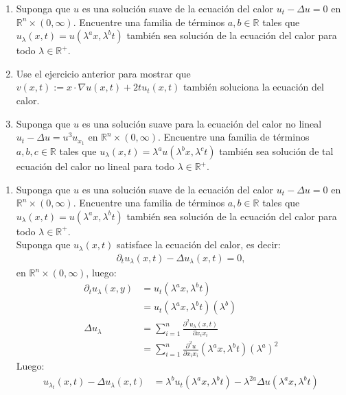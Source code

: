 \begin{homeworkProblem}
  \begin{enumerate}
    \item Suponga que $u$ es una solución suave de la ecuación del calor $u_t-\Delta u=0$ en $\mathbb{R}^{n}\times (0,\infty)$. Encuentre una familia de términos $a,b\in\mathbb{R}$ tales que $u_\lambda(x,t)=u(\lambda^ax,\lambda^bt)$ también sea solución de la ecuación del calor para todo $\lambda\in\mathbb{R}^{+}$.
    \item Use el ejercicio anterior para mostrar que $v(x,t):=x\cdot \nabla u(x,t)+2tu_t(x,t)$ también soluciona la ecuación del calor.
    \item Suponga que $u$ es una solución suave para la ecuación del calor no lineal $u_t-\Delta u=u^3u_{x_1}$ en $\mathbb{R}^{n}\times (0,\infty)$. Encuentre una familia de términos $a,b,c\in\mathbb{R}$ tales que $u_\lambda(x,t)=\lambda^au(\lambda^bx,\lambda^ct)$ también sea solución de tal ecuación del calor no lineal para todo $\lambda\in\mathbb{R}^{+}$. 
  \end{enumerate}
  \begin{solucion}
    \begin{enumerate}
      \item Suponga que $u$ es una solución suave de la ecuación del calor $u_t-\Delta u=0$ en $\mathbb{R}^{n}\times (0,\infty)$. Encuentre una familia de términos $a,b\in\mathbb{R}$ tales que $u_\lambda(x,t)=u(\lambda^ax,\lambda^bt)$ también sea solución de la ecuación del calor para todo $\lambda\in\mathbb{R}^{+}$.\\
        Suponga que $u_\lambda(x,t)$ satisface la ecuación del calor, es decir:
        \begin{align*}
          \partial_{t}u_{\lambda}(x,t)-\Delta u_{\lambda}(x,t)=0,
        \end{align*}
        en $\mathbb{R}^{n} \times (0,\infty)$, luego:
        \begin{align*}
          \partial_{t}u_{\lambda}(x,y)&=u_t(\lambda^ax,\lambda^bt)\\
          &=u_t(\lambda^ax,\lambda^bt)(\lambda^b)\\
          \Delta u_\lambda&=\sum_{i=1}^{n}\frac{\partial^2 u_\lambda(x,t)}{\partial x_ix_i}\\
          &=\sum_{i=1}^n\frac{\partial^2 u}{\partial x_ix_i}(\lambda^ax,\lambda^bt)(\lambda^a)^2
        \end{align*}
        Luego:
        \begin{align*}
          u_{\lambda_t}(x,t)-\Delta u_\lambda(x,t)&=\lambda^b u_t(\lambda^ax,\lambda^{b}t)-\lambda^{2a}\Delta u (\lambda^ax,\lambda^bt)\\

\end{align*}
\end{enumerate}
\end{solucion}
\end{homeworkProblem}
